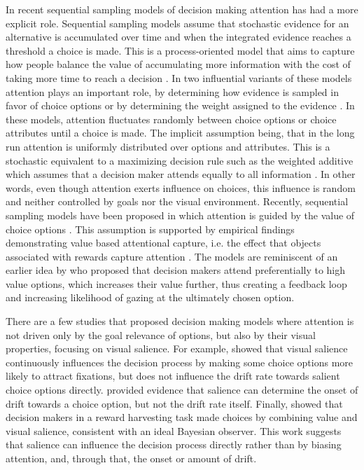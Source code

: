 \documentclass[english,natbib,man,floatsintext]{apa6}
\begin{document}
In recent sequential sampling models of decision making attention has had a more explicit role. Sequential sampling models assume that stochastic evidence for an alternative is accumulated over time and when the integrated evidence reaches a threshold a choice is made. This is a process-oriented model that aims to capture how people balance the value of accumulating more information with the cost of taking more time to reach a decision \citep{forstmann2016}. In two influential variants of these models attention plays an important role, by determining how evidence is sampled in favor of choice options \citep{busemeyer1992} or by determining the weight assigned to the evidence \citep{krajbich2010a, thomas2019}. In these models, attention fluctuates randomly between choice options or choice attributes until a choice is made. The implicit assumption being, that in the long run attention is uniformly distributed over options and attributes. This is a stochastic equivalent to a maximizing decision rule such as the weighted additive which assumes that a decision maker attends equally to all information \cite{gloeckner2011a, payne1988}. In other words, even though attention exerts influence on choices, this influence is random and neither controlled by goals nor the visual environment. Recently, sequential sampling models have been proposed in which attention is guided by the value of choice options \citep{callaway2019a, gluth2018, gluth2020}. This assumption is supported by empirical findings demonstrating value based attentional capture, i.e. the effect that objects associated with rewards capture attention \citep{lepelley2015}. The models are reminiscent of an earlier idea by \cite{shimojo2003a} who proposed that decision makers attend preferentially to high value options, which increases their value further, thus creating a feedback loop and increasing likelihood of gazing at the ultimately chosen option. 

There are a few studies that proposed decision making models where attention is not driven only by the goal relevance of options, but also by their visual properties, focusing on visual salience. For example, \cite{towal2013a} showed that visual salience continuously influences the decision process by making some choice options more likely to attract fixations, but does not influence the drift rate towards salient choice options directly. \cite{chen2013} provided evidence that salience can determine the onset of drift towards a choice option, but not the drift rate itself. Finally, \cite{navalpakkam2010} showed that decision makers in a reward harvesting task made choices by combining value and visual salience, consistent with an ideal Bayesian observer. This work suggests that salience can influence the decision process directly rather than by biasing attention, and, through that, the onset or amount of drift. 
\end{document}
